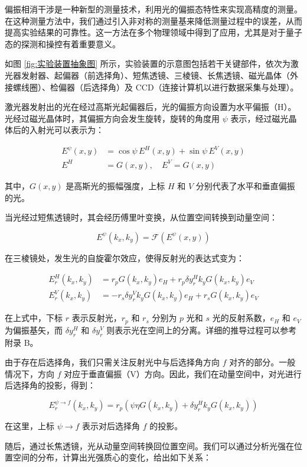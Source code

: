 \documentclass[12pt]{ctexart}
\numberwithin{equation}{section} %
\begin{document}
偏振相消干涉是一种新型的测量技术，利用光的偏振态特性来实现高精度的测量。在这种测量方法中，我们通过引入非对称的测量基来降低测量过程中的误差，从而提高实验结果的可靠性。这一方法在多个物理领域中得到了应用，尤其是对于量子态的探测和操控有着重要意义。

如图 \ref{fig:实验装置抽象图} 所示，实验装置的示意图包括若干关键部件，依次为激光器发射器、起偏器（前选择角）、短焦透镜、三棱镜、长焦透镜、磁光晶体（外接螺线圈）、检偏器（后选择角）及 CCD（连接计算机以进行数据采集与处理）。

激光器发射出的光在经过高斯光起偏器后，光的偏振方向设置为水平偏振（H）。光经过磁光晶体时，其偏振方向会发生旋转，旋转的角度用 $\psi$ 表示，经过磁光晶体后的入射光可以表示为：

\begin{align*}
E^\psi(x,y) &= \cos\psi \, E^H(x,y) + \sin\psi \, E^V(x,y) \\
E^H &= G(x,y), \quad E^V = G(x,y)
\end{align*}

其中，$G(x,y)$ 是高斯光的振幅强度，上标 $H$ 和 $V$ 分别代表了水平和垂直偏振的光。

当光经过短焦透镜时，其会经历傅里叶变换，从位置空间转换到动量空间：

$$
E^\psi(k_x,k_y) = \mathcal{F}(E^\psi(x,y))
$$

在三棱镜处，发生光的自旋霍尔效应，使得反射光的表达式变为：

\begin{align*}
E^H_r(k_x,k_y) &= r_p G(k_x,k_y) e_H + r_p \delta y_r^H k_y G(k_x,k_y) e_V \\
E^V_r(k_x,k_y) &= -r_s \delta y_r^V k_y G(k_x,k_y) e_H + r_s G(k_x,k_y) e_V
\end{align*}

在上式中，下标 $r$ 表示反射光，$r_p$ 和 $r_s$ 分别为 $p$ 光和 $s$ 光的反射系数，$e_H$ 和 $e_V$ 为偏振基矢，而 $\delta y_r^H$ 和 $\delta y_r^V$ 则表示光在空间上的分离。详细的推导过程可以参考附录 B。

由于存在后选择角，我们只需关注反射光中与后选择角方向 $f$ 对齐的部分。一般情况下，方向 $f$ 对应于垂直偏振（V）方向。因此，我们在动量空间中，对光进行后选择角的投影，得到：

$$
E_r^{\psi \to f}(k_x,k_y) = r_p \left( \psi \eta G(k_x,k_y) + \delta y_r^H k_y G(k_x,k_y) \right)
$$

在这里，上标 $\psi \to f$ 表示对后选择角 $f$ 的投影。

随后，通过长焦透镜，光从动量空间转换回位置空间。我们可以通过分析光强在位置空间的分布，计算出光强质心的变化，给出如下关系：
\end{document}
